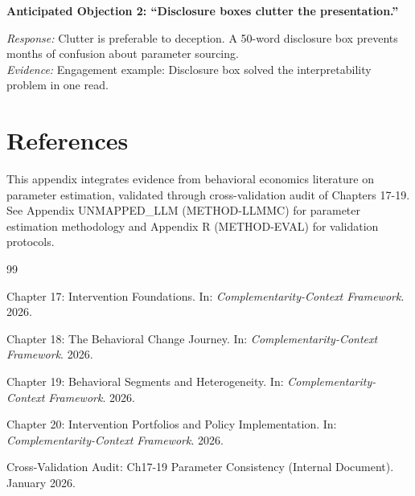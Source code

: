 \begin{table}[htbp]
\textbf{Anticipated Objection 2: ``Disclosure boxes clutter the presentation.''}
\begin{itemize}[nosep]
\textit{Response:} Clutter is preferable to deception. A 50-word disclosure box prevents months of confusion about parameter sourcing.
\\ \textit{Evidence:} Engagement example: Disclosure box solved the interpretability problem in one read.
\end{itemize}


\section{References}
\label{sec:jjj-references}

This appendix integrates evidence from behavioral economics literature on parameter estimation, validated through cross-validation audit of Chapters 17-19. See Appendix UNMAPPED_LLM (METHOD-LLMMC) for parameter estimation methodology and Appendix R (METHOD-EVAL) for validation protocols.

\nocite{bcm_master}

\begin{thebibliography}{99}

Chapter 17: Intervention Foundations. In: \textit{Complementarity-Context Framework}. 2026.

Chapter 18: The Behavioral Change Journey. In: \textit{Complementarity-Context Framework}. 2026.

Chapter 19: Behavioral Segments and Heterogeneity. In: \textit{Complementarity-Context Framework}. 2026.

Chapter 20: Intervention Portfolios and Policy Implementation. In: \textit{Complementarity-Context Framework}. 2026.

Cross-Validation Audit: Ch17-19 Parameter Consistency (Internal Document). January 2026.

\end{thebibliography}



\end{table}

